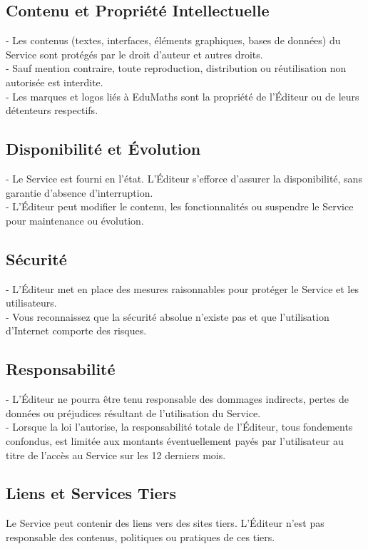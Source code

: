 \documentclass[12pt]{article}
\newcommand{\NomService}{EduMaths}
\begin{document}
\subsection{Contenu et Propriété Intellectuelle}
- Les contenus (textes, interfaces, éléments graphiques, bases de données) du Service sont protégés par le droit d'auteur et autres droits.\\
- Sauf mention contraire, toute reproduction, distribution ou réutilisation non autorisée est interdite.\\
- Les marques et logos liés à \NomService{} sont la propriété de l'Éditeur ou de leurs détenteurs respectifs.

\subsection{Disponibilité et Évolution}
- Le Service est fourni en l'état. L'Éditeur s'efforce d'assurer la disponibilité, sans garantie d'absence d'interruption.\\
- L'Éditeur peut modifier le contenu, les fonctionnalités ou suspendre le Service pour maintenance ou évolution.

\subsection{Sécurité}
- L'Éditeur met en place des mesures raisonnables pour protéger le Service et les utilisateurs.\\
- Vous reconnaissez que la sécurité absolue n'existe pas et que l'utilisation d'Internet comporte des risques.

\subsection{Responsabilité}
- L'Éditeur ne pourra être tenu responsable des dommages indirects, pertes de données ou préjudices résultant de l'utilisation du Service.\\
- Lorsque la loi l'autorise, la responsabilité totale de l'Éditeur, tous fondements confondus, est limitée aux montants éventuellement payés par l'utilisateur au titre de l'accès au Service sur les 12 derniers mois.

\subsection{Liens et Services Tiers}
Le Service peut contenir des liens vers des sites tiers. L'Éditeur n'est pas responsable des contenus, politiques ou pratiques de ces tiers.
\end{document}

